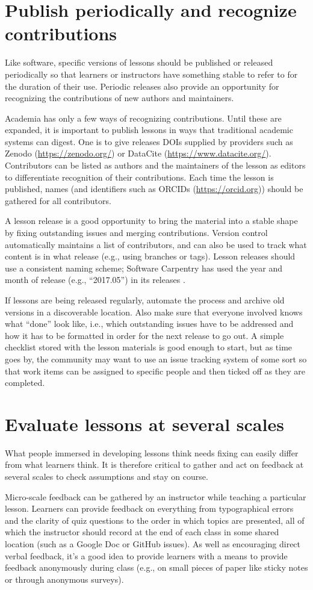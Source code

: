 \documentclass[10pt,letterpaper]{article}
\newcommand{\rulemajor}[2]{\section{#1}\label{#2}}
\begin{document}
\rulemajor{Publish periodically and recognize contributions}{publish}

Like software,
specific versions of lessons should be published or released periodically
so that learners or instructors have something stable to refer to for the duration of their use.
Periodic releases also provide an opportunity
for recognizing the contributions of new authors and maintainers.

Academia has only a few ways of recognizing contributions.
Until these are expanded,
it is important to publish lessons in ways that traditional academic systems can digest.
One is to give releases DOIs supplied by providers such as Zenodo (\url{https://zenodo.org/})
or DataCite (\url{https://www.datacite.org/}).
Contributors can be listed as authors
and the maintainers of the lesson as editors
to differentiate recognition of their contributions.
Each time the lesson is published,
names (and identifiers such as ORCIDs (\url{https://orcid.org}))
should be gathered for all contributors.

A lesson release is a good opportunity to bring the material into a stable shape
by fixing outstanding issues and merging contributions.
Version control automatically maintains a list of contributors,
and can also be used to track what content is in what release
(e.g., using branches or tags).
Lesson releases should use a consistent naming scheme;
Software Carpentry has used the year and month of release
(e.g., ``2017.05'')
in its releases \cite{shell2015,shell2017}.

If lessons are being released regularly,
automate the process
and archive old versions in a discoverable location.
Also make sure that everyone involved knows what ``done'' look like,
i.e.,
which outstanding issues have to be addressed
and how it has to be formatted
in order for the next release to go out.
A simple checklist stored with the lesson materials is good enough to start,
but as time goes by,
the community may want to use an issue tracking system of some sort
so that work items can be assigned to specific people
and then ticked off as they are completed.

\rulemajor{Evaluate lessons at several scales}{evaluate}

What people immersed in developing lessons think needs fixing
can easily differ from what learners think.
It is therefore critical to gather and act on feedback at several scales
to check assumptions and stay on course.

Micro-scale feedback can be gathered by an instructor while teaching a particular lesson.
Learners can provide feedback on everything from typographical errors
and the clarity of quiz questions
to the order in which topics are presented,
all of which the instructor should record at the end of each class
in some shared location (such as a Google Doc or GitHub issues).
As well as encouraging direct verbal feedback,
it's a good idea to provide learners with a means to provide feedback anonymously during class
(e.g., on small pieces of paper like sticky notes or through anonymous surveys).
\end{document}
